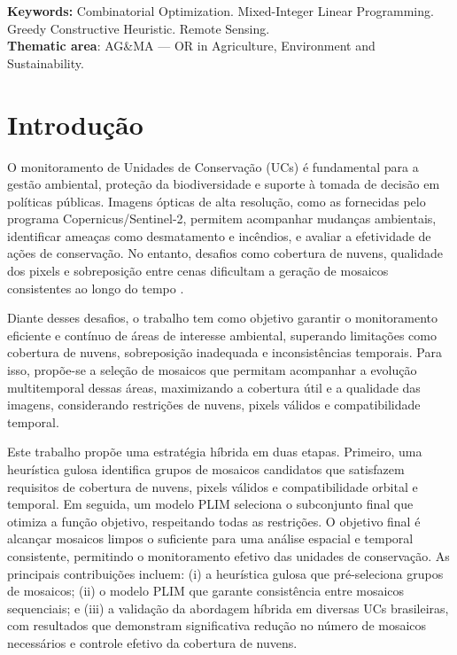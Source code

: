 \documentclass[a4paper,11pt]{article}
\begin{document}
\noindent
\textbf{Keywords:} Combinatorial Optimization. Mixed-Integer Linear Programming. Greedy Constructive Heuristic. Remote Sensing.\\
\noindent\textbf{Thematic area}: AG\&MA --- OR in Agriculture, Environment and Sustainability.
\newpage

\section{Introdução}
\vspace{-5mm}
O monitoramento de Unidades de Conservação (UCs) é fundamental para a gestão ambiental, proteção da biodiversidade e suporte à tomada de decisão em políticas públicas. Imagens ópticas de alta resolução, como as fornecidas pelo programa Copernicus/Sentinel-2, permitem acompanhar mudanças ambientais, identificar ameaças como desmatamento e incêndios, e avaliar a efetividade de ações de conservação. No entanto, desafios como cobertura de nuvens, qualidade dos pixels e sobreposição entre cenas dificultam a geração de mosaicos consistentes ao longo do tempo \citep{rodriguez-puerta:2024}.

Diante desses desafios, o trabalho tem como objetivo garantir o monitoramento eficiente e contínuo de áreas de interesse ambiental, superando limitações como cobertura de nuvens, sobreposição inadequada e inconsistências temporais. Para isso, propõe-se a seleção de mosaicos que permitam acompanhar a evolução multitemporal dessas áreas, maximizando a cobertura útil e a qualidade das imagens, considerando restrições de nuvens, pixels válidos e compatibilidade temporal.

Este trabalho propõe uma estratégia híbrida em duas etapas. Primeiro, uma heurística gulosa identifica grupos de mosaicos candidatos que satisfazem requisitos de cobertura de nuvens, pixels válidos e compatibilidade orbital e temporal. Em seguida, um modelo PLIM seleciona o subconjunto final que otimiza a função objetivo, respeitando todas as restrições. O objetivo final é alcançar mosaicos limpos o suficiente para uma análise espacial e temporal consistente, permitindo o monitoramento efetivo das unidades de conservação. As principais contribuições incluem: (i) a heurística gulosa que pré-seleciona grupos de mosaicos; (ii) o modelo PLIM que garante consistência entre mosaicos sequenciais; e (iii) a validação da abordagem híbrida em diversas UCs brasileiras, com resultados que demonstram significativa redução no número de mosaicos necessários e controle efetivo da cobertura de nuvens.
\end{document}
